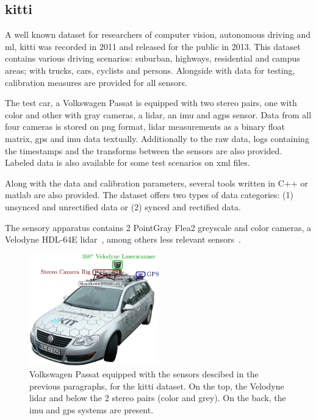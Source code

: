 \subsection{\ac{kitti}}
A well known dataset for researchers of computer vision, autonomous driving and \ac{ml}, \ac{kitti} was recorded in 2011 and released for the public in 2013. This dataset contains various driving scenarios: suburban, highways, residential and campus areas; with trucks, cars, cyclists and persons. Alongside with data for testing, calibration measures are provided for all sensors.

The test car, a Volkswagen Passat is equipped with two stereo pairs, one with color and other with gray cameras, a \ac{lidar}, an \ac{imu} and a\ac{gps} sensor. Data from all four cameras is stored on \ac{png} format, \ac{lidar} measurements as a binary float matrix, \ac{gps} and {imu} data textually. Additionally to the raw data, logs containing the timestamps and the transforms between the sensors are also provided. Labeled data is also available for some test scenarios on \ac{xml} files.

Along with the data and calibration parameters, several tools written in C++ or \ac{matlab} are also provided. The dataset offers two types of data categories: (1) unsynced and unrectified data or (2) synced and rectified data. 

The sensory apparatus contains 2 PointGray Flea2 greyscale and color cameras, a Velodyne HDL-64E \ac{lidar}~\cite{VelodyneHDL64}, among others less relevant sensors~\cite{Geiger2013a}.

\begin{figure}
	\centering
	\includegraphics[width=0.5\textwidth]{img/sensor_fusion/passat_sensors.jpg}
	\caption{Volkswagen Passat equipped with the sensors descibed in the previous paragraphs, for the \ac{kitti} dataset. On the top, the Velodyne \ac{lidar} and below the 2 stereo pairs (color and grey). On the back, the \ac{imu} and {gps} systems are present.}
	\label{fig:sota:kitti_sensors}
\end{figure}


